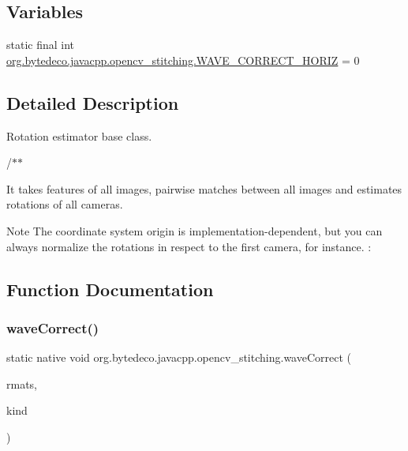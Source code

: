 \subsection*{Variables}
\begin{DoxyCompactItemize}
\item 
static final int \hyperlink{group__stitching__rotation_ga5b86272961257cad2cfb216bf6ca414b}{org.\+bytedeco.\+javacpp.\+opencv\+\_\+stitching.\+W\+A\+V\+E\+\_\+\+C\+O\+R\+R\+E\+C\+T\+\_\+\+H\+O\+R\+IZ} = 0
\end{DoxyCompactItemize}


\subsection{Detailed Description}
Rotation estimator base class. 

/$\ast$$\ast$

It takes features of all images, pairwise matches between all images and estimates rotations of all cameras. 

\begin{DoxyNote}{Note}
The coordinate system origin is implementation-\/dependent, but you can always normalize the rotations in respect to the first camera, for instance. \+: 
\end{DoxyNote}


\subsection{Function Documentation}
\mbox{\label{group__stitching__rotation_ga3bba1a4cfe47a38f2ef140a3bc6c0f0a}} 
\subsubsection{\texorpdfstring{wave\+Correct()}{waveCorrect()}}
{\footnotesize\ttfamily static native void org.\+bytedeco.\+javacpp.\+opencv\+\_\+stitching.\+wave\+Correct (\begin{DoxyParamCaption}\item[{@By\+Ref Mat\+Vector}]{rmats,  }\item[{@Cast(\char`\"{}cv\+::detail\+::\+Wave\+Correct\+Kind\char`\"{}) int}]{kind }\end{DoxyParamCaption})\hspace{0.3cm}{\ttfamily [static]}}



